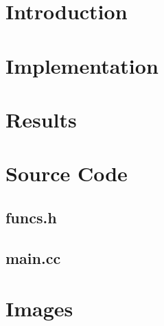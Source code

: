 \section{Introduction}

\section{Implementation}

\section{Results}

\newpage

\section{Source Code}
  \subsection{funcs.h}
    
  \subsection{main.cc}
    
%    
\newpage
\section{Images}
  
